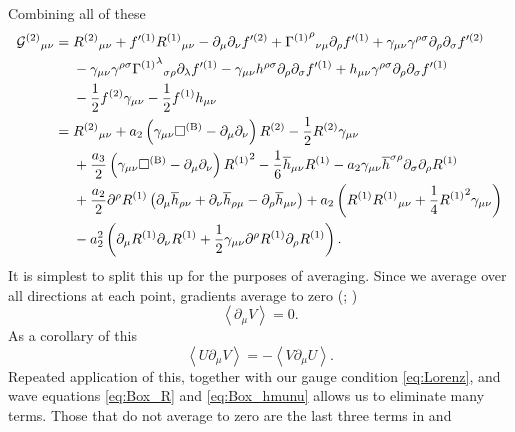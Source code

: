 Combining all of these
\begin{align}
{\mathcal{G}^{(2)}}_{\mu\nu} = {} & {R^{(2)}}_{\mu\nu} + f'^{(1)}{R^{(1)}}_{\mu\nu} - \partial_\mu\partial_\nu f'^{(2)} + {{\Gamma^{(1)}}^\rho}_{\nu\mu}\partial_\rho f'^{(1)} + \gamma_{\mu\nu}\gamma^{\rho\sigma}\partial_\rho\partial_\sigma f'^{(2)} \nonumber \\*
  & - {} \gamma_{\mu\nu}\gamma^{\rho\sigma}{{\Gamma^{(1)}}^\lambda}_{\sigma\rho}\partial_\lambda f'^{(1)} - \gamma_{\mu\nu}h^{\rho\sigma}\partial_\rho\partial_\sigma f'^{(1)} + h_{\mu\nu}\gamma^{\rho\sigma}\partial_\rho\partial_\sigma f'^{(1)} \nonumber \\*
  & - {} \dfrac{1}{2}f^{(2)}\gamma_{\mu\nu} - \dfrac{1}{2}f^{(1)}h_{\mu\nu} \nonumber \\*
 = {} & {R^{(2)}}_{\mu\nu} + a_2\left(\gamma_{\mu\nu}\Box^{(\text{B})} - \partial_\mu\partial_\nu\right)R^{(2)} - \dfrac{1}{2}R^{(2)}\gamma_{\mu\nu} \nonumber \\*
  & + {} \dfrac{a_3}{2}\left(\gamma_{\mu\nu}\Box^{(\text{B})} - \partial_\mu\partial_\nu\right){R^{(1)}}^2 - \dfrac{1}{6}\overline{h}_{\mu\nu}R^{(1)} - a_2\gamma_{\mu\nu}\overline{h}^{\sigma\rho}\partial_\sigma\partial_\rho R^{(1)} \nonumber \\*
  & + {} \dfrac{a_2}{2} \partial^\rho R^{(1)} \left(\partial_\mu\overline{h}_{\rho\nu} + \partial_\nu\overline{h}_{\rho\mu} - \partial_\rho\overline{h}_{\mu\nu}\right) + a_2\left(R^{(1)}{R^{(1)}}_{\mu\nu} + \dfrac{1}{4}{R^{(1)}}^2\gamma_{\mu\nu}\right) \nonumber \\* 
  & - {} a_2^2\left(\partial_\mu R^{(1)}\partial_\nu R^{(1)} + \dfrac{1}{2} \gamma_{\mu\nu}\partial^\rho R^{(1)}\partial_\rho R^{(1)}\right).
 \label{eq:G2}
\end{align}
It is simplest to split this up for the purposes of averaging. Since we average over all directions at each point, gradients average to zero (\citealt[section 17.11]{Hobson2006}; \citealt{Stein2011})
\begin{equation}
\left\langle\partial_\mu V\right\rangle = 0.
\end{equation}
As a corollary of this
\begin{equation}
\left\langle U\partial_\mu V\right\rangle = -\left\langle V \partial_\mu U\right\rangle.
\end{equation}
Repeated application of this, together with our gauge condition \eqref{eq:Lorenz}, and wave equations \eqref{eq:Box_R} and \eqref{eq:Box_hmunu} allows us to eliminate many terms. Those that do not average to zero are the last three terms in  and

